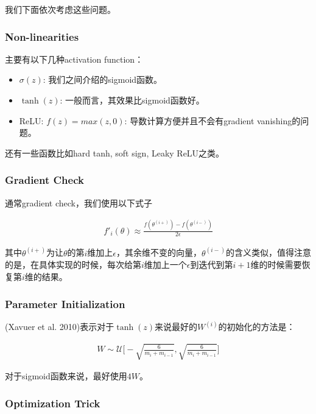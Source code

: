 \documentclass{article}
\begin{document}
我们下面依次考虑这些问题。

\subsubsection*{Non-linearities}

主要有以下几种activation function：

\begin{itemize}
	\item $\sigma(z)$: 我们之间介绍的sigmoid函数。
	\item $\tanh(z)$: 一般而言，其效果比sigmoid函数好。
	\item ReLU: $f(z)=max(z, 0)$: 导数计算方便并且不会有gradient vanishing的问题。
\end{itemize}

还有一些函数比如hard tanh, soft sign, Leaky ReLU之类。

\subsubsection*{Gradient Check}

通常gradient check，我们使用以下式子

\begin{eqnarray}
f'_i(\theta)\approx\frac{f(\theta^{(i+)})-f(\theta^{(i-)})}{2\epsilon}
\end{eqnarray}

其中$\theta^{(i+)}$为让$\theta$的第$i$维加上$\epsilon$，其余维不变的向量，$\theta^{(i-)}$的含义类似，值得注意的是，在具体实现的时候，每次给第$i$维加上一个$\epsilon$到迭代到第$i+1$维的时候需要恢复第$i$维的结果。

\subsubsection*{Parameter Initialization}

(Xavuer et al. 2010)表示对于$\tanh(z)$来说最好的$W^{(i)}$的初始化的方法是：

\begin{eqnarray}
W \sim \mathcal{U}\Big[ -\sqrt{\frac{6}{m_{i}+m_{i-1}}}, \sqrt{\frac{6}{m_{i}+m_{i-1}}}\Big]
\end{eqnarray}

对于sigmoid函数来说，最好使用$4W$。

\subsubsection*{Optimization Trick}
\end{document}
